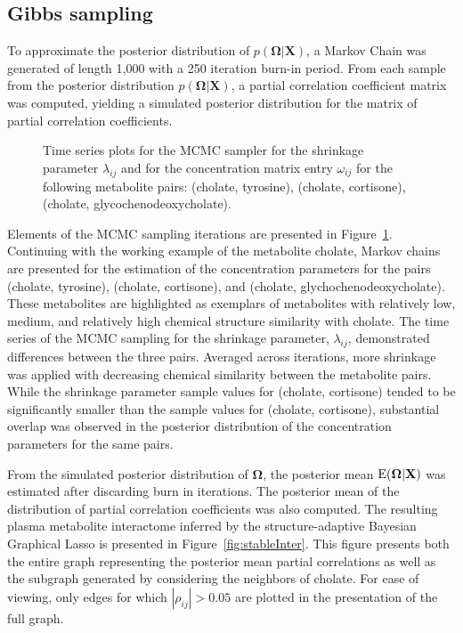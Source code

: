 \begin{DoubleSpace*}
\section{Gibbs sampling}
To approximate the posterior distribution of $p(\boldsymbol{\Omega}|\textbf{X})$, a Markov Chain was generated of length 1,000 with a 250 iteration burn-in period. From each sample from the posterior distribution $p(\boldsymbol{\Omega}|\textbf{X})$, a partial correlation coefficient matrix was computed, yielding a simulated posterior distribution for the matrix of partial correlation coefficients.

\begin{figure}[H]
	\caption[Time series plots for the MCMC sampler for the shrinkage parameter $\lambda_{ij}$ and for the concentration matrix entry $\omega_{ij}$ for the following metabolite pairs: (cholate, tyrosine), (cholate, cortisone), (cholate, glycochenodeoxycholate)]{\DoubleSpacing Time series plots for the MCMC sampler for the shrinkage parameter $\lambda_{ij}$ and for the concentration matrix entry $\omega_{ij}$ for the following metabolite pairs: (cholate, tyrosine), (cholate, cortisone), (cholate, glycochenodeoxycholate).  \label{fig:mcmc} }
\end{figure}

Elements of the MCMC sampling iterations are presented in Figure~\ref{fig:mcmc}. Continuing with the working example of the metabolite cholate, Markov chains are presented for the estimation of the concentration parameters for the pairs (cholate, tyrosine), (cholate, cortisone), and (cholate, glychochenodeoxycholate). These metabolites are highlighted as exemplars of metabolites with relatively low, medium, and relatively high chemical structure similarity with cholate. The time series of the MCMC sampling for the shrinkage parameter, $\lambda_{ij}$, demonstrated differences between the three pairs. Averaged across iterations, more shrinkage was applied with decreasing chemical similarity between the metabolite pairs. While the shrinkage parameter sample values for (cholate, cortisone) tended to be significantly smaller than the sample values for (cholate, cortisone), substantial overlap was observed in the posterior distribution of the concentration parameters for the same pairs.

From the simulated posterior distribution of $\boldsymbol{\Omega}$, the posterior mean $\operatorname{E}(\boldsymbol{\Omega}|\textbf{X})$ was estimated after discarding burn in iterations. The posterior mean of the distribution of partial correlation coefficients was also computed. The resulting plasma metabolite interactome inferred by the structure-adaptive Bayesian Graphical Lasso is presented in Figure~\ref{fig:stableInter}. This figure presents both the entire graph representing the posterior mean partial correlations as well as the subgraph generated by considering the neighbors of cholate. For ease of viewing, only edges for which $|\rho_{ij}|>0.05$ are plotted in the presentation of the full graph. 


\end{DoubleSpace*}
